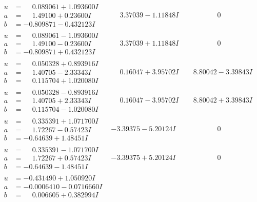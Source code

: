 \documentclass[1p]{elsarticle_modified}
\theoremstyle{definition}
\begin{document}
$$\begin{array}{c|c|c}
\begin{aligned}
u &= \phantom{-}0.089061 + 1.093600 I \\
a &= \phantom{-}1.49100 + 0.23600 I \\
b &= -0.809871 - 0.432123 I\end{aligned}
 & \phantom{-}3.37039 - 1.11848 I & \phantom{-0.000000 } 0 \\ \hline\begin{aligned}
u &= \phantom{-}0.089061 - 1.093600 I \\
a &= \phantom{-}1.49100 - 0.23600 I \\
b &= -0.809871 + 0.432123 I\end{aligned}
 & \phantom{-}3.37039 + 1.11848 I & \phantom{-0.000000 } 0 \\ \hline\begin{aligned}
u &= \phantom{-}0.050328 + 0.893916 I \\
a &= \phantom{-}1.40705 - 2.33343 I \\
b &= \phantom{-}0.115704 + 1.020080 I\end{aligned}
 & \phantom{-}0.16047 + 3.95702 I & \phantom{-}8.80042 - 3.39843 I \\ \hline\begin{aligned}
u &= \phantom{-}0.050328 - 0.893916 I \\
a &= \phantom{-}1.40705 + 2.33343 I \\
b &= \phantom{-}0.115704 - 1.020080 I\end{aligned}
 & \phantom{-}0.16047 - 3.95702 I & \phantom{-}8.80042 + 3.39843 I \\ \hline\begin{aligned}
u &= \phantom{-}0.335391 + 1.071700 I \\
a &= \phantom{-}1.72267 - 0.57423 I \\
b &= -0.64639 + 1.48451 I\end{aligned}
 & -3.39375 - 5.20124 I & \phantom{-0.000000 } 0 \\ \hline\begin{aligned}
u &= \phantom{-}0.335391 - 1.071700 I \\
a &= \phantom{-}1.72267 + 0.57423 I \\
b &= -0.64639 - 1.48451 I\end{aligned}
 & -3.39375 + 5.20124 I & \phantom{-0.000000 } 0 \\ \hline\begin{aligned}
u &= -0.431490 + 1.050920 I \\
a &= -0.0006410 - 0.0716660 I \\
b &= \phantom{-}0.006605 + 0.382994 I\end{aligned}

\end{array}$$
\end{document}
